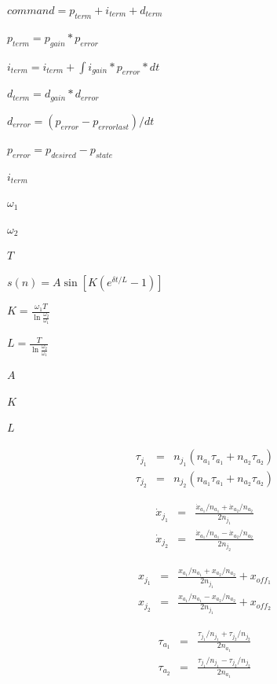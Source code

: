 \documentclass{article}
\begin{document}
$command  = p_{term} + i_{term} + d_{term} $
\pagebreak

$ p_{term}  = p_{gain} * p_{error} $
\pagebreak

$ i_{term}  = i_{term} + \int{i_{gain} * p_{error} * dt} $
\pagebreak

$ d_{term}  = d_{gain} * d_{error} $
\pagebreak

$ d_{error} = (p_{error} - p_{error last}) / dt $
\pagebreak

$ p_{error}  = p_{desired} - p_{state} $
\pagebreak

$i_{term}$
\pagebreak

$\omega_1$
\pagebreak

$\omega_2$
\pagebreak

$T$
\pagebreak

$s(n) = A \sin [ K(e^{\delta t/L} - 1) ]$
\pagebreak

$K = \frac{\omega_1T}{\ln \frac{\omega_2}{\omega_1} }$
\pagebreak

$L = \frac{T}{\ln \frac{\omega_2}{\omega_1} }$
\pagebreak

$A$
\pagebreak

$K$
\pagebreak

$L$
\pagebreak

\begin{eqnarray*}
\tau_{j_1} & = & n_{j_1} ( n_{a_1} \tau_{a_1} + n_{a_2} \tau_{a_2} ) \\[2.5em]
\tau_{j_2} & = & n_{j_2} ( n_{a_1} \tau_{a_1} + n_{a_2} \tau_{a_2} )
\end{eqnarray*}
\pagebreak

\begin{eqnarray*}
\dot{x}_{j_1} & = & \frac{ \dot{x}_{a_1} / n_{a_1} + \dot{x}_{a_2} / n_{a_2} }{2 n_{j_1}} \\[1em]
\dot{x}_{j_2} & = & \frac{ \dot{x}_{a_1} / n_{a_1} - \dot{x}_{a_2} / n_{a_2} }{2 n_{j_2}}
\end{eqnarray*}
\pagebreak

\begin{eqnarray*}
x_{j_1} & = & \frac{ x_{a_1} / n_{a_1} + x_{a_2} / n_{a_2} }{2 n_{j_1}}  + x_{off_1} \\[1em]
x_{j_2} & = & \frac{ x_{a_1} / n_{a_1} - x_{a_2} / n_{a_2} }{2 n_{j_1}}  + x_{off_2}
\end{eqnarray*}
\pagebreak

\begin{eqnarray*}
\tau_{a_1} & = & \frac{ \tau_{j_1} / n_{j_1} + \tau_{j_2} / n_{j_2} }{2 n_{a_1}} \\[1em]
\tau_{a_2} & = & \frac{ \tau_{j_1} / n_{j_1} - \tau_{j_2} / n_{j_2} }{2 n_{a_1}}
\end{eqnarray*}
\pagebreak
\end{document}
